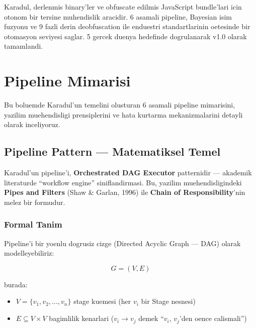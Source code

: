 \documentclass[12pt,a4paper,oneside]{book}
\theoremstyle{definition}
\begin{document}
\begin{ozet}
Karadul, derlenm\-is binary'ler ve obfuscate edilmis JavaScript bundle'lari icin otonom bir tersine muhendislik arac\-idir. 6 asamali pipeline, Bayesian isim fuzyonu ve 9 fazli derin deobfuscation ile enduestri standartlarinin oetesinde bir otomasyon seviyesi saglar. 5 gercek duenya hedefinde dogrulana\-rak v1.0 olarak tamamlandi.
\end{ozet}


\chapter{Pipeline Mimarisi}
\label{ch:pipeline}

Bu boluemde Karadul'un temelini olusturan 6 asamali pipeline mimarisini, yazilim muehendisligi prensiplerini ve hata kurtarma mekanizmalarini detayli olarak inceliyoruz.

\section{Pipeline Pattern --- Matematiksel Temel}
\label{sec:pipeline-pattern}

Karadul'un pipeline'i, \textbf{Orchestrated DAG Executor} patternidir --- akademik literaturde ``workflow engine'' siniflandirmasi. Bu, yazilim muehendisligindeki \textbf{Pipes and Filters} (Shaw \& Garlan, 1996) ile \textbf{Chain of Responsibility}'nin melez bir formudur.

\subsection{Formal Tanim}

Pipeline'i bir yoenlu dogrusiz cizge (Directed Acyclic Graph --- DAG) olarak modelleyebiliriz:

\begin{equation}
G = (V, E)
\label{eq:dag}
\end{equation}

burada:
\begin{itemize}
\item $V = \{v_1, v_2, \ldots, v_n\}$ stage kuemesi (her $v_i$ bir Stage nesnesi)
\item $E \subseteq V \times V$ bagimlilik kenarlari ($v_i \to v_j$ demek ``$v_i$, $v_j$'den oence calismali'')
\end{itemize}
\end{document}
